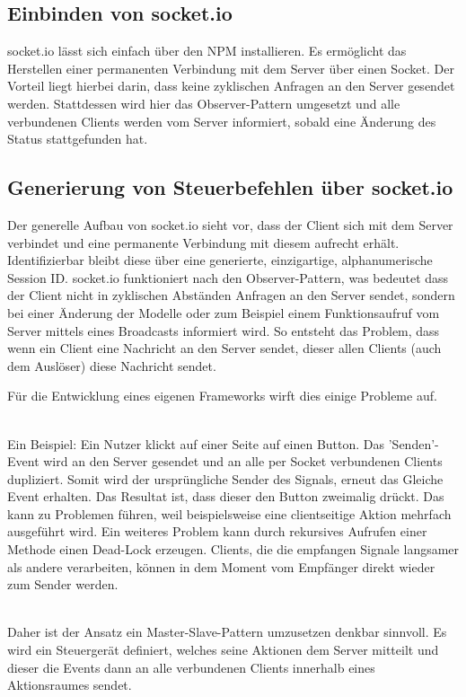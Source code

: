 	\subsection{Einbinden von socket.io}
	socket.io lässt sich einfach über den NPM installieren. Es ermöglicht das Herstellen einer permanenten Verbindung mit dem Server über einen Socket. Der Vorteil liegt hierbei darin, dass keine zyklischen Anfragen an den Server gesendet werden. Stattdessen wird hier das Observer-Pattern umgesetzt und alle verbundenen Clients werden vom Server informiert, sobald eine Änderung des Status stattgefunden hat. 
	
	\subsection{Generierung von Steuerbefehlen über socket.io}
	Der generelle Aufbau von socket.io sieht vor, dass der Client sich mit dem Server verbindet und eine permanente Verbindung mit diesem aufrecht erhält. Identifizierbar bleibt diese über eine generierte, einzigartige, alphanumerische Session ID. socket.io funktioniert nach den Observer-Pattern, was bedeutet dass der Client nicht in zyklischen Abständen Anfragen an den Server sendet, sondern bei einer Änderung der Modelle oder zum Beispiel einem Funktionsaufruf vom Server mittels eines Broadcasts informiert wird. So entsteht das Problem, dass wenn ein Client eine Nachricht an den Server sendet, dieser allen Clients (auch dem Auslöser) diese Nachricht sendet. 
	
	
Für die Entwicklung eines eigenen Frameworks wirft dies einige Probleme auf.

\\ Ein  Beispiel: Ein Nutzer klickt auf einer Seite auf einen Button. Das 'Senden'-Event wird an den Server gesendet und an alle per Socket verbundenen Clients dupliziert. Somit wird der ursprüngliche Sender des Signals, erneut das Gleiche Event erhalten. Das Resultat ist, dass dieser den Button zweimalig drückt. Das kann zu Problemen führen, weil beispielsweise eine clientseitige Aktion mehrfach ausgeführt wird. Ein weiteres Problem kann durch rekursives Aufrufen einer Methode einen Dead-Lock erzeugen. Clients, die die empfangen Signale langsamer als andere verarbeiten, können in dem Moment vom Empfänger direkt wieder zum Sender werden.
	
	\\Daher ist der Ansatz ein Master-Slave-Pattern umzusetzen denkbar sinnvoll. Es wird ein Steuergerät definiert, welches seine Aktionen dem Server mitteilt und dieser die Events dann an alle verbundenen Clients innerhalb eines Aktionsraumes sendet.
	
